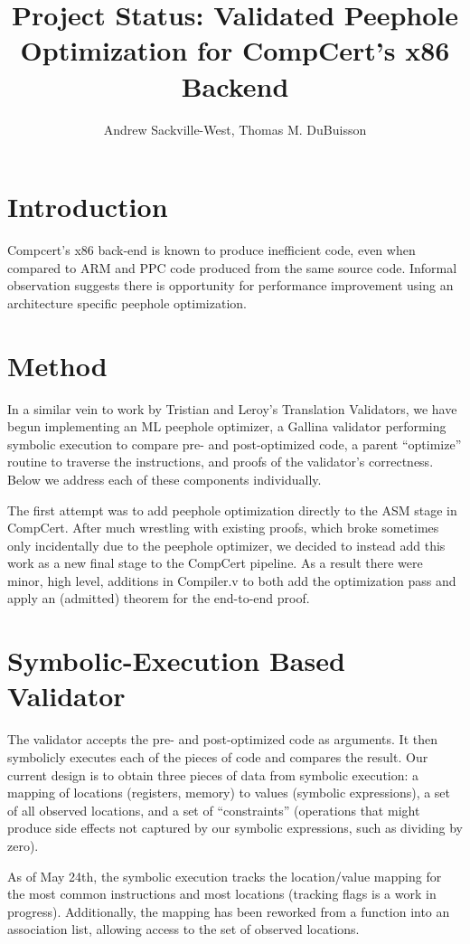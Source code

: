 \documentclass{article}
\title{Project Status: Validated Peephole Optimization for CompCert's x86 Backend}
\author{Andrew Sackville-West, Thomas M. DuBuisson}
\begin{document}
\maketitle

\section{Introduction}

Compcert's x86 back-end is known to produce inefficient code, even
when compared to ARM and PPC code produced from the same source
code.  Informal observation suggests there is opportunity for
performance improvement using an architecture specific peephole
optimization.

\section{Method}
In a similar vein to work by Tristian and Leroy's Translation
Validators, we have begun implementing an ML peephole optimizer, a
Gallina validator performing symbolic execution to compare pre- and
post-optimized code, a parent ``optimize'' routine to traverse the
instructions, and proofs of the validator's correctness.  Below we
address each of these components individually.

The first attempt was to add peephole optimization directly to the ASM
stage in CompCert.  After much wrestling with existing proofs, which
broke sometimes only incidentally due to the peephole optimizer, we
decided to instead add this work as a new final stage to the CompCert
pipeline.  As a result there were minor, high level, additions in
Compiler.v to both add the optimization pass and apply an (admitted)
theorem for the end-to-end proof.

\section{Symbolic-Execution Based Validator}
The validator accepts the pre- and post-optimized code as arguments.
It then symbolicly executes each of the pieces of code and compares
the result.  Our current design is to obtain three pieces of data from
symbolic execution: a mapping of locations (registers, memory) to
values (symbolic expressions), a set of all observed locations, and a
set of ``constraints'' (operations that might produce side effects not
captured by our symbolic expressions, such as dividing by zero).

As of May 24th, the symbolic execution tracks the location/value
mapping for the most common instructions and most locations (tracking
flags is a work in progress).  Additionally, the mapping has been
reworked from a function into an association list, allowing access to
the set of observed locations.
\end{document}
